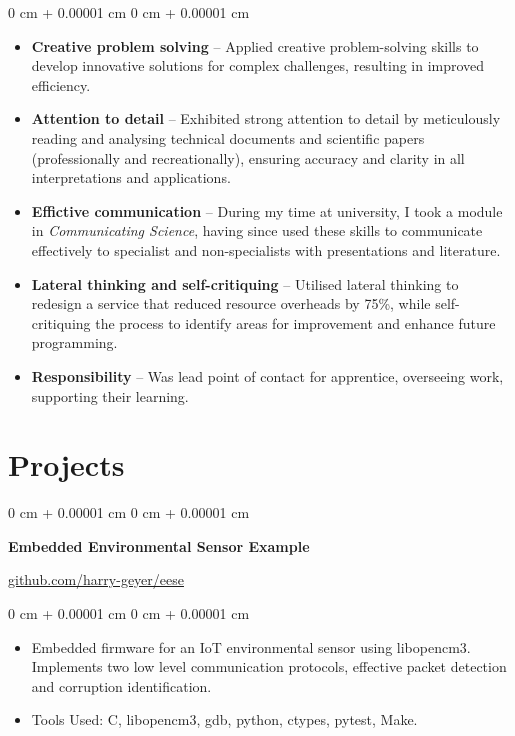 \documentclass[10pt, letterpaper]{article}
\newenvironment{highlights}{
    \begin{itemize}[
        topsep=0.10 cm,
        parsep=0.10 cm,
        partopsep=0pt,
        itemsep=0pt,
        leftmargin=0 cm + 10pt
    ]
}{
    \end{itemize}
}
\newenvironment{onecolentry}{
    \begin{adjustwidth}{
        0 cm + 0.00001 cm
    }{
        0 cm + 0.00001 cm
    }
}{
    \end{adjustwidth}
}
\newenvironment{twocolentry}[2][]{
    \onecolentry
    \def\secondColumn{#2}
    \setcolumnwidth{\fill, 4.5 cm}
    \begin{paracol}{2}
}{
    \switchcolumn \raggedleft \secondColumn
    \end{paracol}
    \endonecolentry
}
\begin{document}
        \begin{onecolentry}
            \begin{highlights}
                \item \textbf{Creative problem solving} -- Applied creative problem-solving skills to develop innovative solutions for complex challenges, resulting in improved efficiency.
                \item \textbf{Attention to detail} -- Exhibited strong attention to detail by meticulously reading and analysing technical documents and scientific papers (professionally and recreationally), ensuring accuracy and clarity in all interpretations and applications.
                \item \textbf{Effictive communication} -- During my time at university, I took a module in \textit{Communicating Science}, having since used these skills to communicate effectively to specialist and non-specialists with presentations and literature. 
                \item \textbf{Lateral thinking and self-critiquing} -- Utilised lateral thinking to redesign a service that reduced resource overheads by 75\%, while self-critiquing the process to identify areas for improvement and enhance future programming.
                \item \textbf{Responsibility} -- Was lead point of contact for apprentice, overseeing work, supporting their learning.
            \end{highlights}
        \end{onecolentry}

    \section{Projects}
        
        \begin{twocolentry}{
            \href{https://github.com/harry-geyer/eese}{github.com/harry-geyer/eese}
        }
            \textbf{Embedded Environmental Sensor Example}
        \end{twocolentry}

        \vspace{0.10 cm}
        \begin{onecolentry}
            \begin{highlights}
                \item Embedded firmware for an IoT environmental sensor using libopencm3. Implements two low level communication protocols, effective packet detection and corruption identification. 
                \item Tools Used: C, libopencm3, gdb, python, ctypes, pytest, Make.
            \end{highlights}
        \end{onecolentry}
\end{document}
